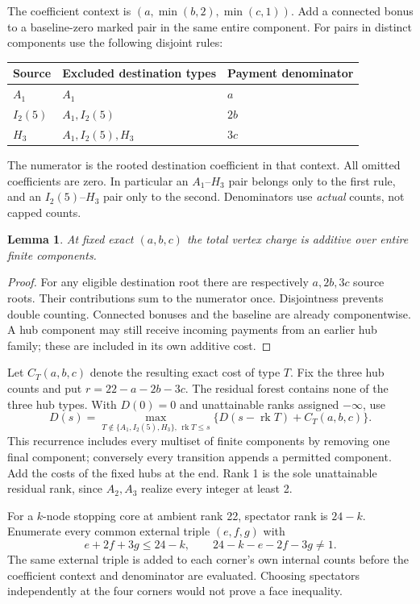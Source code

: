 \documentclass[11pt]{article}
\newtheorem{lemma}[theorem]{Lemma}
\newcommand{\rk}{\operatorname{rk}}
\begin{document}
The coefficient context is $(a,\min(b,2),\min(c,1))$. Add a connected
bonus to a baseline-zero marked pair in the same entire component. For
pairs in distinct components use the following disjoint rules:
\begin{center}
\begin{tabular}{lll}\toprule
Source&Excluded destination types&Payment denominator\\\midrule
$A_1$&$A_1$&$a$\\
$I_2(5)$&$A_1,I_2(5)$&$2b$\\
$H_3$&$A_1,I_2(5),H_3$&$3c$\\\bottomrule
\end{tabular}
\end{center}
The numerator is the rooted destination coefficient in that context.
All omitted coefficients are zero. In particular an $A_1$--$H_3$ pair
belongs only to the first rule, and an $I_2(5)$--$H_3$ pair only to the
second. Denominators use \emph{actual} counts, not capped counts.

\begin{lemma}\label{lem:additive}
At fixed exact $(a,b,c)$ the total vertex charge is additive over entire
finite components.
\end{lemma}
\begin{proof}
For any eligible destination root there are respectively $a,2b,3c$
source roots. Their contributions sum to the numerator once. Disjointness
prevents double counting. Connected bonuses and the baseline are already
componentwise. A hub component may still receive incoming payments from
an earlier hub family; these are included in its own additive cost.
\end{proof}

Let $C_T(a,b,c)$ denote the resulting exact cost of type $T$. Fix the
three hub counts and put $r=22-a-2b-3c$. The residual forest contains none
of the three hub types. With $D(0)=0$ and unattainable ranks assigned
$-\infty$, use
\[
 D(s)=\max_{T\notin\{A_1,I_2(5),H_3\},\,\rk T\le s}
       \{D(s-\rk T)+C_T(a,b,c)\}.
\]
This recurrence includes every multiset of finite components by removing
one final component; conversely every transition appends a permitted
component. Add the costs of the fixed hubs at the end. Rank 1 is the sole
unattainable residual rank, since $A_2,A_3$ realize every integer at least 2.

For a $k$-node stopping core at ambient rank 22, spectator rank is $24-k$.
Enumerate every common external triple $(e,f,g)$ with
\[
 e+2f+3g\le 24-k,\qquad 24-k-e-2f-3g\ne 1.
\]
The same external triple is added to each corner's own internal counts
before the coefficient context and denominator are evaluated. Choosing
spectators independently at the four corners would not prove a face
inequality.
\end{document}
